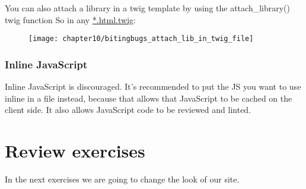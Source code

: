 You can also attach a library in a twig template by using the attach\_library() twig function So in any \url{*.html.twig}:



\begin{figure}[H]
	\centering
	\texttt{[image: chapter10/bitingbugs\_attach\_lib\_in\_twig\_file]}
	\label{fig:bitingbugs_attach_lib_in_twig_file}
\end{figure}

\subsubsection{Inline JavaScript}

Inline JavaScript is discouraged. It's recommended to put the JS you want to use inline in a file instead, because that allows that JavaScript to be cached on the client side. It also allows JavaScript code to be reviewed and linted.



\section{Review exercises}

In the next exercises we are going to change the look of our site. 

